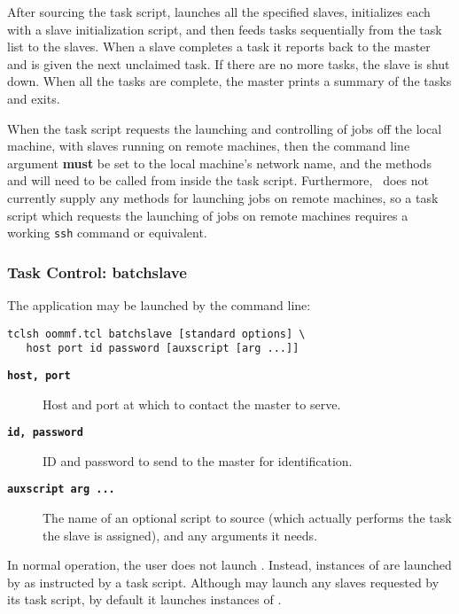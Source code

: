 After sourcing the task script,  launches all the
specified slaves, initializes each with a slave initialization script,
and then feeds tasks sequentially from the task list to the slaves.
When a slave completes a task it reports back to the master and is given
the next unclaimed task.  If there are no more tasks, the slave is shut
down.  When all the tasks are complete, the master prints a summary of
the tasks and exits.

When the task script requests the launching and controlling of jobs off
the local machine, with slaves running on remote machines, then the
command line argument  {\bf must} be set to the local machine's
network name, and the  methods  and
 will need to be called from inside the task script.
Furthermore, \OOMMF\ does not currently supply any methods for launching
jobs on remote machines, so a task script which requests the launching
of jobs on remote machines requires a working
\verb+ssh+ command or
equivalent.

\subsubsection{Task Control: batchslave}\par
The application  may be launched by the command line:
\begin{verbatim}
tclsh oommf.tcl batchslave [standard options] \
   host port id password [auxscript [arg ...]]
\end{verbatim}
\begin{description}
\item[{\tt\bf host, port}]
  Host and port at which to contact the master to serve.
\item[{\tt\bf id, password}]
  ID and password to send to the master for identification.
\item[{\tt\bf auxscript arg ...}]
  The name of an optional script to source (which actually performs the
  task the slave is assigned), and any arguments it needs.
\end{description}

In normal operation, the user does not launch
.  Instead, instances of  are
launched by  as instructed by a task script.
Although \app{batchmaster} may launch any slaves requested
by its task script, by default it launches instances of
.

